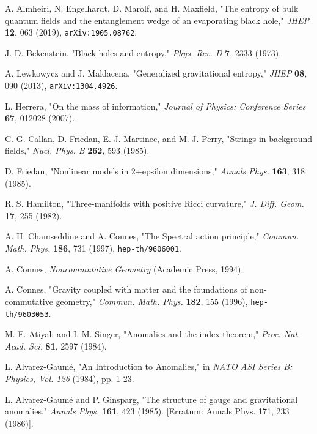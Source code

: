 \documentclass[11pt, letterpaper]{report}
\theoremstyle{plain} %
\theoremstyle{definition} %
\theoremstyle{remark} %
\begin{document}
\begin{thebibliography}{99}
A. Almheiri, N. Engelhardt, D. Marolf, and H. Maxfield, "The entropy of bulk quantum fields and the entanglement wedge of an evaporating black hole," \textit{JHEP} \textbf{12}, 063 (2019), \texttt{arXiv:1905.08762}.

J. D. Bekenstein, "Black holes and entropy," \textit{Phys. Rev. D} \textbf{7}, 2333 (1973).

\label{Lewkowycz2013}
A. Lewkowycz and J. Maldacena, "Generalized gravitational entropy," \textit{JHEP} \textbf{08}, 090 (2013), \texttt{arXiv:1304.4926}.

L. Herrera, "On the mass of information," \textit{Journal of Physics: Conference Series} \textbf{67}, 012028 (2007).

C. G. Callan, D. Friedan, E. J. Martinec, and M. J. Perry, "Strings in background fields," \textit{Nucl. Phys. B} \textbf{262}, 593 (1985).

D. Friedan, "Nonlinear models in 2+epsilon dimensions," \textit{Annals Phys.} \textbf{163}, 318 (1985).

R. S. Hamilton, "Three-manifolds with positive Ricci curvature," \textit{J. Diff. Geom.} \textbf{17}, 255 (1982).

\label{Chamseddine1997SpectralAction}
A. H. Chamseddine and A. Connes, "The Spectral action principle," \textit{Commun. Math. Phys.} \textbf{186}, 731 (1997), \texttt{hep-th/9606001}.

A. Connes, \textit{Noncommutative Geometry} (Academic Press, 1994).

A. Connes, "Gravity coupled with matter and the foundations of non-commutative geometry," \textit{Commun. Math. Phys.} \textbf{182}, 155 (1996), \texttt{hep-th/9603053}.

M. F. Atiyah and I. M. Singer, "Anomalies and the index theorem," \textit{Proc. Nat. Acad. Sci.} \textbf{81}, 2597 (1984).

L. Alvarez-Gaumé, "An Introduction to Anomalies," in \textit{NATO ASI Series B: Physics, Vol. 126} (1984), pp. 1-23.

L. Alvarez-Gaumé and P. Ginsparg, "The structure of gauge and gravitational anomalies," \textit{Annals Phys.} \textbf{161}, 423 (1985). [Erratum: Annals Phys. 171, 233 (1986)].


\end{thebibliography}
\end{document}
